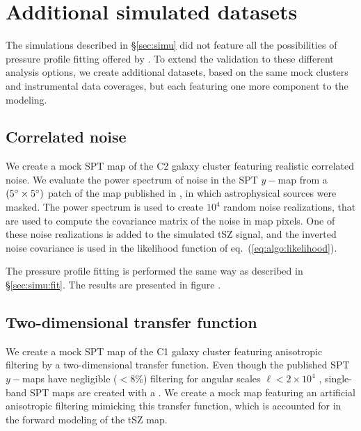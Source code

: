 \section{Additional simulated datasets} \label{sec:extra_simu}

The simulations described in \S\ref{sec:simu} did not feature all the possibilities of pressure profile fitting offered by \panco.
To extend the validation to these different analysis options, we create additional datasets, based on the same mock clusters and instrumental data coverages, but each featuring one more component to the modeling.

\subsection{Correlated noise} \label{sec:simi:corr_noise}

We create a mock SPT map of the C2 galaxy cluster featuring realistic correlated noise.
We evaluate the power spectrum of noise in the SPT $y-$map from a $(5\degree \times 5\degree)$ patch of the  map published in \citet{bleem_cmbksz_2022}, in which astrophysical sources were masked.
The power spectrum is used to create $10^4$ random noise realizations, that are used to compute the covariance matrix of the noise in map pixels.
One of these noise realizations is added to the simulated tSZ signal, and the inverted noise covariance is used in the likelihood function of eq.~(\ref{eq:algo:likelihood}).

The pressure profile fitting is performed the same way as described in \S\ref{sec:simu:fit}.
The results are presented in figure \todo.

\subsection{Two-dimensional transfer function} \label{sec:simu:2dtf}

We create a mock SPT map of the C1 galaxy cluster featuring anisotropic filtering by a two-dimensional transfer function.
Even though the published SPT $y-$maps have negligible ($<8\%$) filtering for angular scales $\ell < 2 \times 10^4$ \citep[see][]{bleem_cmbksz_2022}, single-band SPT maps are created with a .
We create a mock map featuring an artificial anisotropic filtering mimicking this transfer function, which is accounted for in the forward modeling of the tSZ map.

